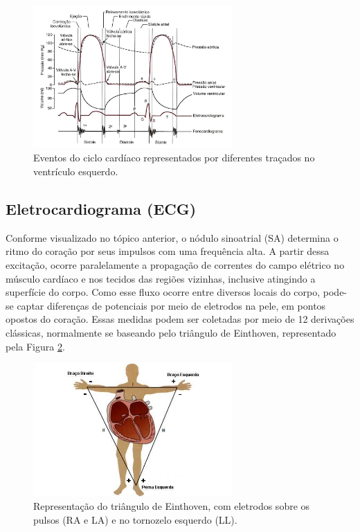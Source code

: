 \documentclass[conference]{IEEEtran}
\begin{document}
\begin{figure}[!h]
	\centering
	\includegraphics[width=3in]{img/eventosCicloCardiaco}
	\caption{Eventos do ciclo cardíaco representados por diferentes traçados no ventrículo esquerdo.}
	\label{eventosCicloCardiaco}
\end{figure}

\subsection{Eletrocardiograma (ECG)}

Conforme visualizado no tópico anterior, o nódulo sinoatrial (SA) determina o ritmo do coração por seus impulsos com uma frequência alta. A partir dessa excitação, ocorre paralelamente a propagação de correntes do campo elétrico no músculo cardíaco e nos tecidos das regiões vizinhas, inclusive atingindo a superfície do corpo. Como esse fluxo ocorre entre diversos locais do corpo, pode-se captar diferenças de potenciais por meio de eletrodos na pele, em pontos opostos do coração. Essas medidas podem ser coletadas por meio de 12 derivações clássicas, normalmente se baseando pelo triângulo de Einthoven, representado pela Figura \ref{trianguloEinthoven}.

\begin{figure}[!h]
	\centering
	\includegraphics[width=3in]{img/trianguloEinthoven}
	\caption{Representação do triângulo de Einthoven, com eletrodos sobre os pulsos (RA e LA) e no tornozelo esquerdo (LL).}
	\label{trianguloEinthoven}
\end{figure}
\end{document}
